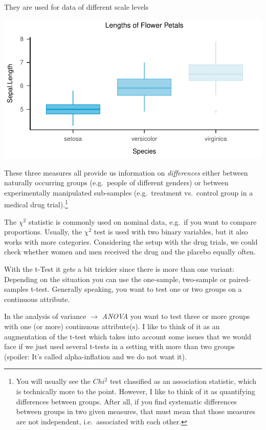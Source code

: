 \documentclass[
]{book}
\begin{document}
They are used for data of different scale levels

\includegraphics{_main_files/figure-html/unnamed-chunk-55-1.pdf}

These three measures all provide us information on \emph{differences} either between naturally occurring groups (e.g.~people of different genders) or between experimentally manipulated sub-samples (e.g.~treatment vs.~control group in a medical drug trial).\footnote{You will usually see the \(Chi^2\) test classified as an association statistic, which is technically more to the point. However, I like to think of it as quantifying differences between groups. After all, if you find systematic differences between groups in two given measures, that must mean that those measures are not independent, i.e.~associated with each other.}

The \(\chi^2\) statistic is commonly used on nominal data, e.g.~if you want to compare proportions.
Usually, the \(\chi^2\) test is used with two binary variables, but it also works with more categories.
Considering the setup with the drug trials, we could check whether women and men received the drug and the placebo equally often.

With the t-Test it gets a bit trickier since there is more than one variant: Depending on the situation you can use the one-sample, two-sample or paired-samples t-test.
Generally speaking, you want to test one or two groups on a continuous attribute.

In the analysis of variance \(\rightarrow\) \emph{ANOVA} you want to test three or more groups with one (or more) continuous attribute(s).
I like to think of it as an augmentation of the t-test which takes into account some issues that we would face if we just used several t-tests in a setting with more than two groups (spoiler: It's called alpha-inflation and we do not want it).
\end{document}
